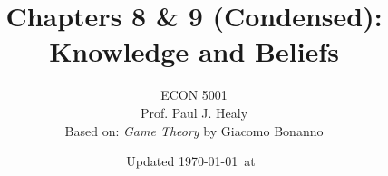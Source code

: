 

\title[Knowledge and Beliefs]{Chapters 8 \& 9 (Condensed): Knowledge and Beliefs}
\author[ECON 5001]{ECON 5001\\Prof. Paul J. Healy\\Based on: \textit{Game Theory} by Giacomo Bonanno} \color{metrop}
\institute[OSU]{}
\date[]{\vfill {\tiny Updated \today\ at\ \DTMcurrenttime}}

%

